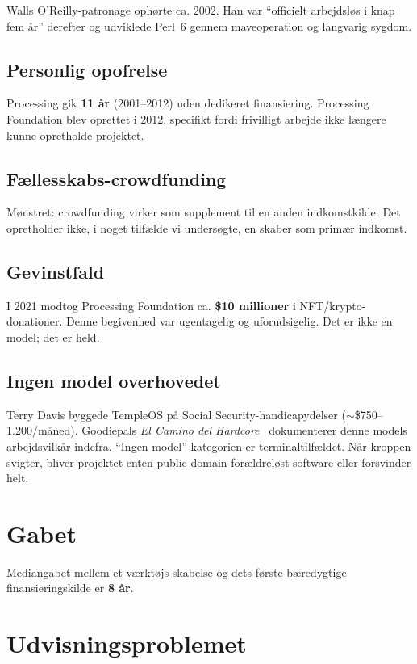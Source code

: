 \documentclass[10pt,letterpaper,twocolumn]{article}
\begin{document}
Walls O'Reilly-patronage ophørte ca. 2002. Han var ``officielt arbejdsløs i knap fem år'' derefter og udviklede Perl~6 gennem maveoperation og langvarig sygdom.

\subsection{Personlig opofrelse}

Processing gik \textbf{11 år} (2001--2012) uden dedikeret finansiering. Processing Foundation blev oprettet i 2012, specifikt fordi frivilligt arbejde ikke længere kunne opretholde projektet.

\subsection{Fællesskabs-crowdfunding}

Mønstret: crowdfunding virker som supplement til en anden indkomstkilde. Det opretholder ikke, i noget tilfælde vi undersøgte, en skaber som primær indkomst.

\subsection{Gevinstfald}

I 2021 modtog Processing Foundation ca. \textbf{\$10 millioner} i NFT/krypto-donationer. Denne begivenhed var ugentagelig og uforudsigelig. Det er ikke en model; det er held.

\subsection{Ingen model overhovedet}

Terry Davis byggede TempleOS på Social Security-handicapydelser ($\sim$\$750--1.200/måned). Goodiepals \emph{El Camino del Hardcore}~\citep{goodiepal2012elcamino} dokumenterer denne models arbejdsvilkår indefra. ``Ingen model''-kategorien er terminaltilfældet. Når kroppen svigter, bliver projektet enten public domain-forældreløst software eller forsvinder helt.

\section{Gabet}

Mediangabet mellem et værktøjs skabelse og dets første bæredygtige finansieringskilde er \textbf{8 år}.

\section{Udvisningsproblemet}
\end{document}
